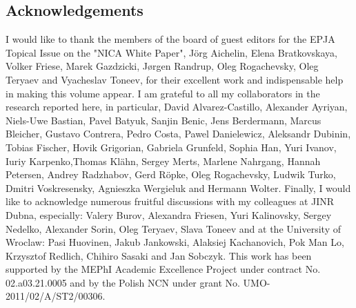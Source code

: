 \documentclass{webofc}
\begin{document}
\subsection*{Acknowledgements}
I would like to thank the members of the board of guest editors for the EPJA Topical Issue on the "NICA White Paper", J\"org Aichelin, Elena Bratkovskaya, Volker Friese, Marek Gazdzicki, J{\o}rgen Randrup, Oleg Rogachevsky, Oleg Teryaev and Vyacheslav Toneev, for their excellent work and indispensable help in making this volume appear. 
I am grateful to all my collaborators in the research reported here, in particular, David Alvarez-Castillo, 
Alexander Ayriyan, Niels-Uwe Bastian, Pavel Batyuk, Sanjin Benic, Jens Berdermann, Marcus Bleicher, Gustavo Contrera, Pedro Costa, Pawel Danielewicz, Aleksandr Dubinin, Tobias Fischer, Hovik Grigorian, Gabriela Grunfeld, Sophia Han, Yuri Ivanov, Iuriy Karpenko,Thomas Kl\"ahn, Sergey Merts, Marlene Nahrgang, Hannah Petersen, Andrey Radzhabov, Gerd R\"opke, Oleg Rogachevsky, Ludwik Turko, 
Dmitri Voskresensky, Agnieszka Wergieluk and Hermann Wolter.  
Finally, I would like to acknowledge numerous fruitful discussions with my colleagues at JINR Dubna, especially: Valery Burov, Alexandra Friesen, Yuri Kalinovsky, Sergey Nedelko, Alexander Sorin, Oleg Teryaev, Slava Toneev and at the University of Wroclaw: Pasi Huovinen, Jakub Jankowski, Alaksiej Kachanovich, Pok Man Lo, Krzysztof Redlich, Chihiro Sasaki and Jan Sobczyk. 
This work has been supported by the MEPhI Academic Excellence Project under contract No. 02.a03.21.0005 and by the Polish NCN under grant No. UMO-2011/02/A/ST2/00306.
\end{document}
